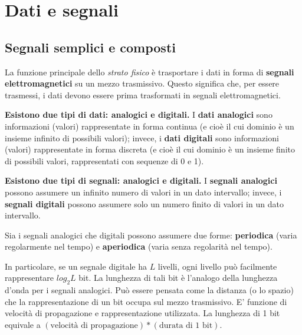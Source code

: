 \section{Dati e segnali}

    \subsection{Segnali semplici e composti}
    
        La funzione principale dello \textit{strato fisico} è trasportare i dati in forma di \textbf{segnali elettromagnetici} su un mezzo trasmissivo. Questo significa che, per essere trasmessi, i dati devono essere prima trasformati in segnali elettromagnetici.
        
        \vspace{3mm}
        
       \textbf{ Esistono due tipi di dati: analogici e digitali.} I \textbf{dati analogici} sono informazioni (valori) rappresentate in forma continua (e cioè il cui dominio è un insieme infinito di possibili valori); invece, i \textbf{dati digitali} sono informazioni (valori) rappresentate in forma discreta (e cioè il cui dominio è un insieme finito di possibili valori, rappresentati con sequenze di 0 e 1).
        
        \vspace{3mm}
        
        \textbf{Esistono due tipi di segnali: analogici e digitali.} I \textbf{segnali analogici} possono assumere un infinito numero di valori in un dato intervallo; invece, i \textbf{segnali digitali} possono assumere solo un numero finito di valori in un dato intervallo.
        
        \vspace{3mm}
        
        Sia i segnali analogici che digitali possono assumere due forme: \textbf{periodica} (varia regolarmente nel tempo) e \textbf{aperiodica} (varia senza regolarità nel tempo).
        
        \vspace{3mm}
        
        In particolare, se un segnale digitale ha \(L\) livelli, ogni livello può facilmente rappresentare \(log_2 L\) bit. La lunghezza di tali bit è l'analogo della lunghezza d'onda per i segnali analogici. Può essere pensata come la distanza (o lo spazio) che la rappresentazione di un bit occupa sul mezzo trasmissivo. E' funzione di velocità di propagazione e rappresentazione utilizzata. La lunghezza di 1 bit equivale a \((\text{velocità di propagazione})*(\text{durata di 1 bit})\).
        
